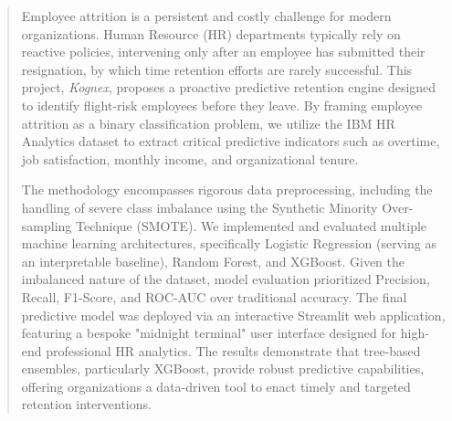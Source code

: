 \documentclass[10pt,a4paper,twocolumn]{report}
\begin{document}
\begin{abstract}
Employee attrition is a persistent and costly challenge for modern organizations. Human Resource (HR) departments typically rely on reactive policies, intervening only after an employee has submitted their resignation, by which time retention efforts are rarely successful. This project, \textit{Kognex}, proposes a proactive predictive retention engine designed to identify flight-risk employees before they leave. By framing employee attrition as a binary classification problem, we utilize the IBM HR Analytics dataset to extract critical predictive indicators such as overtime, job satisfaction, monthly income, and organizational tenure.

The methodology encompasses rigorous data preprocessing, including the handling of severe class imbalance using the Synthetic Minority Over-sampling Technique (SMOTE). We implemented and evaluated multiple machine learning architectures, specifically Logistic Regression (serving as an interpretable baseline), Random Forest, and XGBoost. Given the imbalanced nature of the dataset, model evaluation prioritized Precision, Recall, F1-Score, and ROC-AUC over traditional accuracy. The final predictive model was deployed via an interactive Streamlit web application, featuring a bespoke "midnight terminal" user interface designed for high-end professional HR analytics. The results demonstrate that tree-based ensembles, particularly XGBoost, provide robust predictive capabilities, offering organizations a data-driven tool to enact timely and targeted retention interventions.
\end{abstract}

\tableofcontents
\newpage

\begingroup
\let\chapter\section
\listoffigures
\listoftables
\endgroup
\newpage











\end{document}
